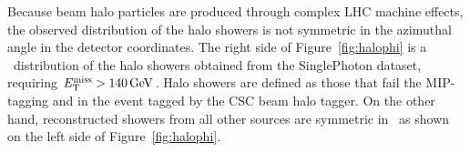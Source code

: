Because beam halo particles are produced through complex LHC machine effects, the observed distribution of the halo showers is not
symmetric in the azimuthal angle in the detector coordinates.
The right side of Figure~\ref{fig:halophi} is a \phig\ distribution of the halo showers obtained from the SinglePhoton dataset, requiring $E_{\mathrm{T}}^{\text{miss}} > 140\,\text{Ge\hspace{-.08em}V}$. 
Halo showers are defined as those that fail the MIP-tagging and in the event tagged by the CSC beam halo tagger. 
On the other hand, reconstructed showers from all other sources are symmetric in \phig\, as shown on the left side of Figure~\ref{fig:halophi}. 

\begin{figure}[htbp]
  \centering
\end{figure}
